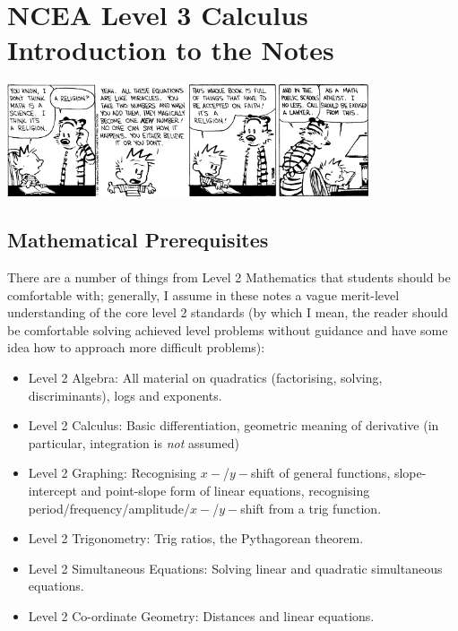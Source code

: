 


\section*{NCEA Level 3 Calculus\\Introduction to the Notes}

\begin{center}
  \includegraphics[width=0.8\textwidth]{hobbes}
\end{center}

\subsection*{Mathematical Prerequisites}
There are a number of things from Level 2 Mathematics that students should be
comfortable with; generally, I assume in these notes a vague merit-level understanding
of the core level 2 standards (by which I mean, the reader should be comfortable solving
achieved level problems without guidance and have some idea how to approach more difficult
problems):
\begin{itemize}
  \item Level 2 Algebra: All material on quadratics (factorising, solving, discriminants), logs and exponents.
  \item Level 2 Calculus: Basic differentiation, geometric meaning of derivative (in particular, integration is \textit{not} assumed)
  \item Level 2 Graphing: Recognising $ x-$/$ y-$shift of general functions, slope-intercept and point-slope form of linear equations,
                          recognising period/frequency/amplitude/$ x-$/$ y-$shift from a trig function.
  \item Level 2 Trigonometry: Trig ratios, the Pythagorean theorem.
  \item Level 2 Simultaneous Equations: Solving linear and quadratic simultaneous equations.
  \item Level 2 Co-ordinate Geometry: Distances and linear equations.
\end{itemize}

